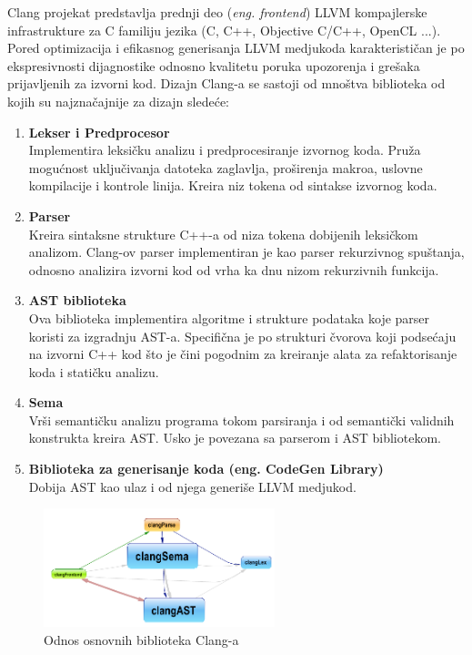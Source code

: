 \documentclass[12pt,oneside]{memoir}
\begin{document}
Clang projekat predstavlja prednji deo (\textit{eng. frontend}) LLVM kompajlerske infrastrukture za C familiju jezika (C, C++, Objective C/C++, OpenCL ...).
Pored optimizacija i efikasnog generisanja LLVM medjukoda karakterističan je po ekspresivnosti dijagnostike odnosno kvalitetu poruka upozorenja i grešaka prijavljenih za izvorni kod. Dizajn Clang-a se sastoji od mnoštva biblioteka od kojih su najznačajnije za dizajn sledeće:

\begin{enumerate}
  \item{\textbf{Lekser i Predprocesor} \\
       Implementira leksičku analizu i predprocesiranje izvornog koda.
       Pruža mogućnost uključivanja datoteka zaglavlja, proširenja makroa, uslovne kompilacije i kontrole linija. 
       Kreira niz tokena od sintakse izvornog koda.}
  \item{\textbf{Parser} \\
        Kreira sintaksne strukture C++-a od niza tokena dobijenih leksičkom analizom.
        Clang-ov parser implementiran je kao parser rekurzivnog spuštanja, odnosno analizira izvorni kod od vrha ka dnu nizom rekurzivnih funkcija.}
  \item{\textbf{AST biblioteka} \\
        Ova biblioteka implementira algoritme i strukture podataka koje parser koristi za izgradnju AST-a. Specifična je po strukturi čvorova koji podsećaju na izvorni C++ kod što je čini pogodnim za kreiranje alata za refaktorisanje koda i statičku analizu.}
  \item{\textbf{Sema} \\
        Vrši semantičku analizu programa tokom parsiranja i od semantički validnih konstrukta kreira AST. Usko je povezana sa parserom i AST bibliotekom.}
  \item{\textbf{Biblioteka za generisanje koda (eng. CodeGen Library)} \\
        Dobija AST kao ulaz i od njega generiše LLVM medjukod.}

\end{enumerate}

\begin{figure}[!ht]
  \centering
  \includegraphics[width=0.6\textwidth]{ClangBiblioteke.png}
  \caption{Odnos osnovnih biblioteka Clang-a}
  \label{fig:grafikon}
\end{figure}
\end{document}
